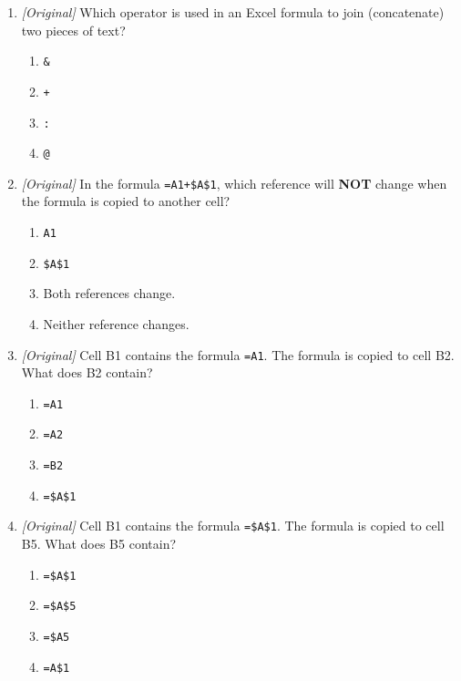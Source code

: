 \begin{enumerate}[label=\textbf{Q\arabic*.}, leftmargin=*]
  \begin{enumerate}[label=\Alph*.]
    \item \texttt{A1}
    \item \texttt{\$A\$1}
    \item \texttt{A\$1}
    \item \texttt{\$A1}
  \end{enumerate}
\item \textit{[Original]} Which operator is used in an Excel formula to join
  (concatenate) two pieces of text?
  \begin{enumerate}[label=\Alph*.]
    \item \texttt{\&}
    \item \texttt{+}
    \item \texttt{:}
    \item \texttt{@}
  \end{enumerate}
\item \textit{[Original]} In the formula \texttt{=A1+\$A\$1}, which reference
  will \textbf{NOT} change when the formula is copied to another cell?
  \begin{enumerate}[label=\Alph*.]
    \item \texttt{A1}
    \item \texttt{\$A\$1}
    \item Both references change.
    \item Neither reference changes.
  \end{enumerate}
\item \textit{[Original]} Cell B1 contains the formula \texttt{=A1}. The
  formula is copied to cell B2. What does B2 contain?
  \begin{enumerate}[label=\Alph*.]
    \item \texttt{=A1}
    \item \texttt{=A2}
    \item \texttt{=B2}
    \item \texttt{=\$A\$1}
  \end{enumerate}
\item \textit{[Original]} Cell B1 contains the formula \texttt{=\$A\$1}. The
  formula is copied to cell B5. What does B5 contain?
  \begin{enumerate}[label=\Alph*.]
    \item \texttt{=\$A\$1}
    \item \texttt{=\$A\$5}
    \item \texttt{=\$A5}
    \item \texttt{=A\$1}
  \end{enumerate}

\end{enumerate}

